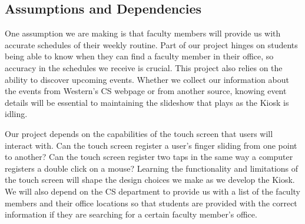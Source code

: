 \subsection{Assumptions and Dependencies}
One assumption we are making is that faculty members will provide us with accurate schedules of their weekly routine. Part of our project hinges on students being able to know when they can find a faculty member in their office, so accuracy in the schedules we receive is crucial. This project also relies on the ability to discover upcoming events. Whether we collect our information about the events from Western’s CS webpage or from another source, knowing event details will be essential to maintaining the slideshow that plays as the Kiosk is idling.
 
Our project depends on the capabilities of the touch screen that users will interact with. Can the touch screen register a user’s finger sliding from one point to another? Can the touch screen register two taps in the same way a computer registers a double click on a mouse? Learning the functionality and limitations of the touch screen will shape the design choices we make as we develop the Kiosk. We will also depend on the CS department to provide us with a list of the faculty members and their office locations so that students are provided with the correct information if they are searching for a certain faculty member’s office.


